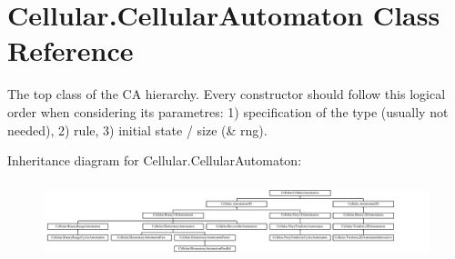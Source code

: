 \hypertarget{class_cellular_1_1_cellular_automaton}{}\section{Cellular.\+Cellular\+Automaton Class Reference}
\label{class_cellular_1_1_cellular_automaton}


The top class of the C\+A hierarchy. Every constructor should follow this logical order when considering its parametres\+: 1) specification of the type (usually not needed), 2) rule, 3) initial state / size (\& rng).  


Inheritance diagram for Cellular.\+Cellular\+Automaton\+:\begin{figure}[H]
\begin{center}
\leavevmode
\includegraphics[height=2.231076cm]{class_cellular_1_1_cellular_automaton}
\end{center}
\end{figure}
